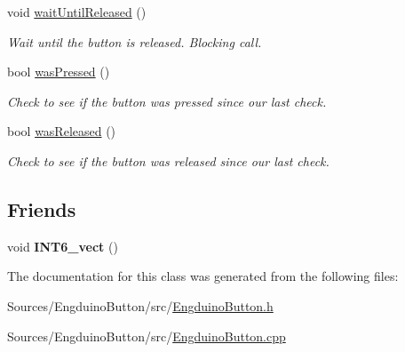\begin{DoxyCompactItemize}
void \hyperlink{group___engduino_button_ga6c073bb47b4514b4489092ff1d8d4191}{wait\+Until\+Released} ()
\begin{DoxyCompactList}\small\item\em Wait until the button is released. Blocking call. \end{DoxyCompactList}\item 
bool \hyperlink{group___engduino_button_gaa7265d49dd122b3a0bf39b01f4219291}{was\+Pressed} ()
\begin{DoxyCompactList}\small\item\em Check to see if the button was pressed since our last check. \end{DoxyCompactList}\item 
bool \hyperlink{group___engduino_button_gad1df7a49cef083fb338415d172232f92}{was\+Released} ()
\begin{DoxyCompactList}\small\item\em Check to see if the button was released since our last check. \end{DoxyCompactList}\end{DoxyCompactItemize}
\subsection*{Friends}
\begin{DoxyCompactItemize}
\item 
\hypertarget{class_engduino_button_class_a52c24bcb5e8232b3f9a81f0759605f05}{}void {\bfseries I\+N\+T6\+\_\+vect} ()\label{class_engduino_button_class_a52c24bcb5e8232b3f9a81f0759605f05}

\end{DoxyCompactItemize}


The documentation for this class was generated from the following files\+:\begin{DoxyCompactItemize}
\item 
Sources/\+Engduino\+Button/src/\hyperlink{_engduino_button_8h}{Engduino\+Button.\+h}\item 
Sources/\+Engduino\+Button/src/\hyperlink{_engduino_button_8cpp}{Engduino\+Button.\+cpp}\end{DoxyCompactItemize}
